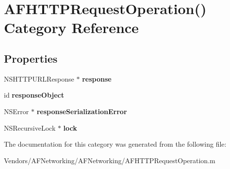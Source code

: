 \hypertarget{category_a_f_h_t_t_p_request_operation_07_08}{}\section{A\+F\+H\+T\+T\+P\+Request\+Operation() Category Reference}
\label{category_a_f_h_t_t_p_request_operation_07_08}
\subsection*{Properties}
\begin{DoxyCompactItemize}
\item 
\hypertarget{category_a_f_h_t_t_p_request_operation_07_08_a5ad5b807b287afadadefdbec24456ee5}{}N\+S\+H\+T\+T\+P\+U\+R\+L\+Response $\ast$ {\bfseries response}\label{category_a_f_h_t_t_p_request_operation_07_08_a5ad5b807b287afadadefdbec24456ee5}

\item 
\hypertarget{category_a_f_h_t_t_p_request_operation_07_08_aa1bec7d5e8060c8f2e452bddf718f06e}{}id {\bfseries response\+Object}\label{category_a_f_h_t_t_p_request_operation_07_08_aa1bec7d5e8060c8f2e452bddf718f06e}

\item 
\hypertarget{category_a_f_h_t_t_p_request_operation_07_08_afae5af9727035f7beb8d46110b0e8a33}{}N\+S\+Error $\ast$ {\bfseries response\+Serialization\+Error}\label{category_a_f_h_t_t_p_request_operation_07_08_afae5af9727035f7beb8d46110b0e8a33}

\item 
\hypertarget{category_a_f_h_t_t_p_request_operation_07_08_af15e0185abdd50087387f36f1f076a51}{}N\+S\+Recursive\+Lock $\ast$ {\bfseries lock}\label{category_a_f_h_t_t_p_request_operation_07_08_af15e0185abdd50087387f36f1f076a51}

\end{DoxyCompactItemize}


The documentation for this category was generated from the following file\+:\begin{DoxyCompactItemize}
\item 
Vendors/\+A\+F\+Networking/\+A\+F\+Networking/A\+F\+H\+T\+T\+P\+Request\+Operation.\+m\end{DoxyCompactItemize}
